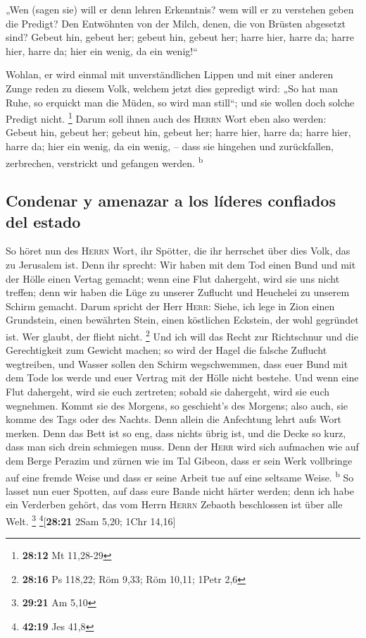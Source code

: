  „Wen (sagen sie) will er denn lehren Erkenntnis? wem will
er zu verstehen geben die Predigt? Den Entwöhnten von der Milch, denen,
die von Brüsten abgesetzt sind?  Gebeut hin, gebeut her;
gebeut hin, gebeut her; harre hier, harre da; harre hier, harre da; hier
ein wenig, da ein wenig!{}``

 Wohlan, er wird einmal mit unverständlichen Lippen und
mit einer anderen Zunge reden zu diesem Volk, welchem jetzt dies
gepredigt wird:  „So hat man Ruhe, so erquickt man die
Müden, so wird man still``; und sie wollen doch solche Predigt nicht.
\footnote{\textbf{28:12} Mt 11,28-29}  Darum soll ihnen
auch des \textsc{Herrn} Wort eben also werden: Gebeut hin, gebeut her;
gebeut hin, gebeut her; harre hier, harre da; harre hier, harre da; hier
ein wenig, da ein wenig, -- dass sie hingehen und zurückfallen,
zerbrechen, verstrickt und gefangen werden. \textsuperscript{b}

\hypertarget{condenar-y-amenazar-a-los-luxedderes-confiados-del-estado}{%
\subsection{Condenar y amenazar a los líderes confiados del
estado}\label{condenar-y-amenazar-a-los-luxedderes-confiados-del-estado}}

 So höret nun des \textsc{Herrn} Wort, ihr Spötter, die
ihr herrschet über dies Volk, das zu Jerusalem ist.  Denn
ihr sprecht: Wir haben mit dem Tod einen Bund und mit der Hölle einen
Vertag gemacht; wenn eine Flut dahergeht, wird sie uns nicht treffen;
denn wir haben die Lüge zu unserer Zuflucht und Heuchelei zu unserem
Schirm gemacht.  Darum spricht der Herr \textsc{Herr}:
Siehe, ich lege in Zion einen Grundstein, einen bewährten Stein, einen
köstlichen Eckstein, der wohl gegründet ist. Wer glaubt, der flieht
nicht. \footnote{\textbf{28:16} Ps 118,22; Röm 9,33; Röm 10,11; 1Petr
  2,6}  Und ich will das Recht zur Richtschnur und die
Gerechtigkeit zum Gewicht machen; so wird der Hagel die falsche Zuflucht
wegtreiben, und Wasser sollen den Schirm wegschwemmen, 
dass euer Bund mit dem Tode los werde und euer Vertrag mit der Hölle
nicht bestehe. Und wenn eine Flut dahergeht, wird sie euch zertreten;
sobald sie dahergeht, wird sie euch wegnehmen.  Kommt sie
des Morgens, so geschieht's des Morgens; also auch, sie komme des Tags
oder des Nachts. Denn allein die Anfechtung lehrt aufs Wort merken.
 Denn das Bett ist so eng, dass nichts übrig ist, und die
Decke so kurz, dass man sich drein schmiegen muss.  Denn
der \textsc{Herr} wird sich aufmachen wie auf dem Berge Perazim und
zürnen wie im Tal Gibeon, dass er sein Werk vollbringe auf eine fremde
Weise und dass er seine Arbeit tue auf eine seltsame Weise.
\textsuperscript{b}  So lasset nun euer Spotten, auf dass
eure Bande nicht härter werden; denn ich habe ein Verderben gehört, das
vom Herrn \textsc{Herrn} Zebaoth beschlossen ist über alle Welt.
\footnote{\textbf{29:21} Am 5,10} \footnote{\textbf{42:19} Jes 41,8}{[}\textbf{28:21}
2Sam 5,20; 1Chr 14,16{]}


